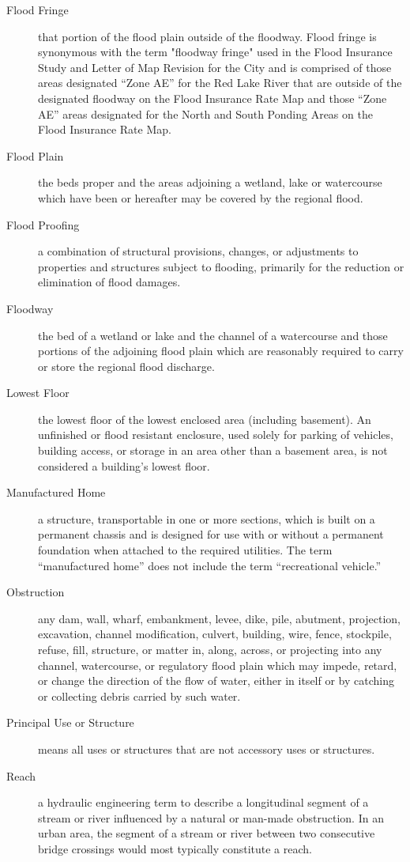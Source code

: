 \begin{description}
    \item[Flood Fringe] that portion of the flood plain outside of the floodway. Flood fringe is synonymous with the term "floodway fringe" used in the Flood Insurance Study and Letter of Map Revision for the City and is comprised of those areas designated “Zone AE” for the Red Lake River that are outside of the designated floodway on the Flood Insurance Rate Map and those “Zone AE” areas designated for the North and South Ponding Areas on the Flood Insurance Rate Map.
    \item[Flood Plain] the beds proper and the areas adjoining a wetland, lake or watercourse which have been or hereafter may be covered by the regional flood.
    \item[Flood Proofing] a combination of structural provisions, changes, or adjustments to properties and structures subject to flooding, primarily for the reduction or elimination of flood damages.
    \item[Floodway] the bed of a wetland or lake and the channel of a watercourse and those portions of the adjoining flood plain which are reasonably required to carry or store the regional flood discharge.
    \item[Lowest Floor] the lowest floor of the lowest enclosed area (including basement). An unfinished or flood resistant enclosure, used solely for parking of vehicles, building access, or storage in an area other than a basement area, is not considered a building’s lowest floor.
    \item[Manufactured Home] a structure, transportable in one or more sections, which is built on a permanent chassis and is designed for use with or without a permanent foundation when attached to the required utilities. The term “manufactured home” does not include the term “recreational vehicle.”
    \item[Obstruction] any dam, wall, wharf, embankment, levee, dike, pile, abutment, projection, excavation, channel modification, culvert, building, wire, fence, stockpile, refuse, fill, structure, or matter in, along, across, or projecting into any channel, watercourse, or regulatory flood plain which may impede, retard, or change the direction of the flow of water, either in itself or by catching or collecting debris carried by such water.
    \item[Principal Use or Structure] means all uses or structures that are not accessory uses or structures.
    \item[Reach] a hydraulic engineering term to describe a longitudinal segment of a stream or river influenced by a natural or man-made obstruction. In an urban area, the segment of a stream or river between two consecutive bridge crossings would most typically constitute a reach.

\end{description}
